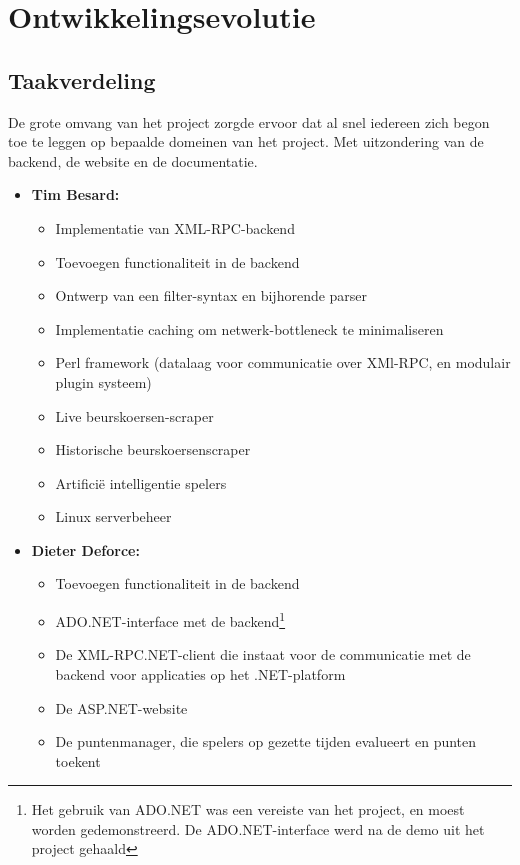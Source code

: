 \chapter{Ontwikkelingsevolutie}


\section{Taakverdeling}
De grote omvang van het project zorgde ervoor dat al snel iedereen zich begon toe te leggen op bepaalde domeinen van het project. Met uitzondering van de backend, de website en de documentatie.

\begin{itemize}
	\item \textbf{Tim Besard: }
	\begin{itemize}
	\item Implementatie van XML-RPC-backend
	\item Toevoegen functionaliteit in de backend
	\item Ontwerp van een filter-syntax en bijhorende parser
	\item Implementatie caching om netwerk-bottleneck te minimaliseren
	\item Perl framework (datalaag voor communicatie over XMl-RPC, en modulair plugin systeem)
	\item Live beurskoersen-scraper
	\item Historische beurskoersenscraper
	\item Artifici\"e intelligentie spelers
	\item Linux serverbeheer
	\end{itemize}
	
	\item \textbf{Dieter Deforce: } 
		\begin{itemize}
			\item Toevoegen functionaliteit in de backend
			\item ADO.NET-interface met de backend\footnote{Het gebruik van ADO.NET was een vereiste van het project, en moest worden gedemonstreerd. De ADO.NET-interface werd na de demo uit het project gehaald}
			\item De XML-RPC.NET-client die instaat voor de communicatie met de backend voor applicaties op het .NET-platform
			\item De ASP.NET-website
			\item De puntenmanager, die spelers op gezette tijden evalueert en punten toekent
		\end {itemize}
		

\end{itemize}
